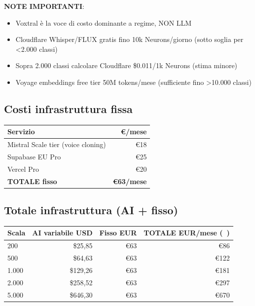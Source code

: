 \documentclass[12pt,a4paper]{article}
\begin{document}
\textbf{NOTE IMPORTANTI}:
\begin{itemize}[leftmargin=*]
  \item Voxtral è la voce di costo dominante a regime, NON LLM
  \item Cloudflare Whisper/FLUX gratis fino 10k Neurons/giorno (sotto soglia per \textless 2.000 classi)
  \item Sopra 2.000 classi calcolare Cloudflare \$0.011/1k Neurons (stima minore)
  \item Voyage embeddings free tier 50M tokens/mese (sufficiente fino \textgreater 10.000 classi)
\end{itemize}

\subsection*{Costi infrastruttura fissa}

\begin{center}
\begin{tabular}{lr}
\toprule
\textbf{Servizio} & \textbf{€/mese} \\
\midrule
Mistral Scale tier (voice cloning) & €18 \\
Supabase EU Pro                    & €25 \\
Vercel Pro                         & €20 \\
\textbf{TOTALE fisso}              & \textbf{€63/mese} \\
\bottomrule
\end{tabular}
\end{center}

\subsection*{Totale infrastruttura (AI + fisso)}

\begin{center}
\begin{tabular}{lrrr}
\toprule
\textbf{Scala} & \textbf{AI variabile USD} & \textbf{Fisso EUR} & \textbf{TOTALE EUR/mese (~)} \\
\midrule
200    & \$25,85  & €63 & ~€86 \\
500    & \$64,63  & €63 & ~€122 \\
1.000  & \$129,26 & €63 & ~€181 \\
2.000  & \$258,52 & €63 & ~€297 \\
5.000  & \$646,30 & €63 & ~€670 \\
\bottomrule
\end{tabular}
\end{center}
\end{document}
